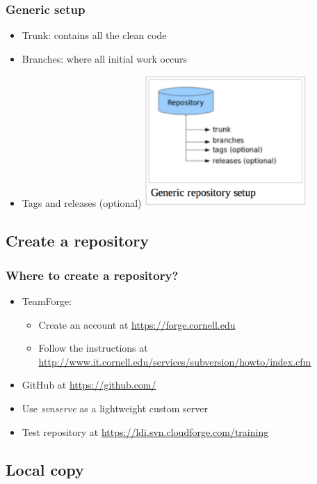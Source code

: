 \documentclass{beamer}
\begin{document}
\frame
{
  \frametitle{Generic setup}
  
  \begin{itemize}
  \item<1-> Trunk: contains all the clean code
  \item<1-> Branches: where all initial work occurs
  \item<1-> Tags and releases (optional)
  \includegraphics[height=5cm]{repo_structure.png}
  \end{itemize}

}

\subsection{Create a repository}
\frame
{
  \frametitle{Where to create a repository?}
  
  \begin{itemize}
  \item<1-> TeamForge:
  	\begin{itemize}
	\item<1-> Create an account at \url{https://forge.cornell.edu}
	\item<1-> Follow the instructions at \url{http://www.it.cornell.edu/services/subversion/howto/index.cfm}
	\end{itemize}
  \item<2-> GitHub at \url{https://github.com/}
  \item<3-> Use \textit{svnserve} as a lightweight custom server
  \item<4-> Test repository at \url{https://ldi.svn.cloudforge.com/training}
  \end{itemize}

}


\subsection{Local copy}
\end{document}
